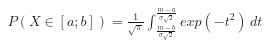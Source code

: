 \documentclass[preview]{standalone}
\begin{document}
\begin{align*}
P( X \in [a;b] ) = { \frac{1}{\sqrt{\pi}} } \int_{ \frac{m - b}{\sigma \sqrt{2}} }^{ \frac{m - a}{\sigma \sqrt{2}} } { exp( -t^2 ) } \, dt
\end{align*}
\end{document}
